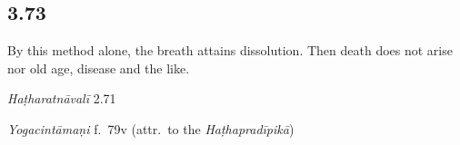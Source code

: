 \begin{ekdosis}


\subsection*{3.73}
\begin{translation}[hp03_073]
By this method alone, the breath attains dissolution. Then death does not arise nor old age, disease and the like.
\end{translation}

\begin{sources}[hp03_073]
\end{sources}

\begin{testimonia}[hp03_073]
\emph{Haṭharatnāvalī} 2.71
\begin{versinnote}
\end{versinnote}

\emph{Yogacintāmaṇi} f.~79v (attr.~to the \emph{Haṭhapradīpikā})
\begin{versinnote}
\end{versinnote}

\end{testimonia}





\end{ekdosis}
